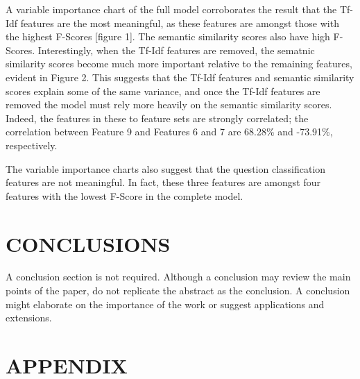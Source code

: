 \documentclass[letterpaper, 10 pt, conference]{ieeeconf}  %
\begin{document}
A variable importance chart of the full model corroborates the result that the Tf-Idf features are the most meaningful, as these features are amongst those with the highest F-Scores [figure 1]. The semantic similarity scores also have high F-Scores. Interestingly, when the Tf-Idf features are removed, the sematnic similarity scores become much more important relative to the remaining features, evident in Figure 2. This suggests that the Tf-Idf features and semantic similarity scores explain some of the same variance, and once the Tf-Idf features are removed the model must rely more heavily on the semantic similarity scores. Indeed, the features in these to feature sets are strongly correlated; the correlation between Feature 9 and Features 6 and 7 are 68.28\% and -73.91\%, respectively. 

The variable importance charts also suggest that the question classification features are not meaningful. In fact, these three features are amongst four features with the lowest F-Score in the complete model. 


\section{CONCLUSIONS}

A conclusion section is not required. Although a conclusion may review the main points of the paper, do not replicate the abstract as the conclusion. A conclusion might elaborate on the importance of the work or suggest applications and extensions. 

\addtolength{\textheight}{-12cm}   %







\section*{APPENDIX}
\end{document}
